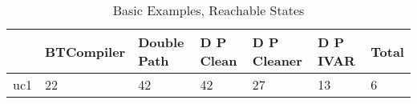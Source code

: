 \begin{table}
\centering
\caption{Basic Examples, Reachable States}
\label{b_e_reach}
\begin{tabular}{lllllll}
\toprule
{} & BTCompiler & Double Path & D P Clean & D P Cleaner & D P IVAR & Total \\
\midrule
uc1 &         22 &          42 &        42 &          27 &       13 &     6 \\
\bottomrule
\end{tabular}
\end{table}
